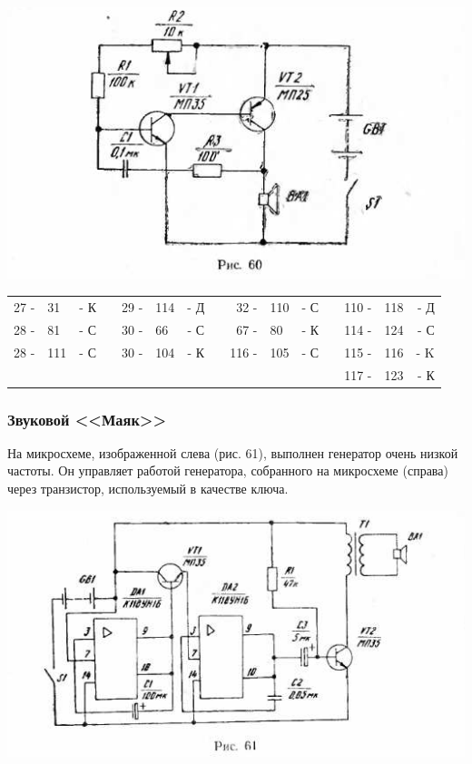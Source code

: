 \documentclass[12pt]{article}
\begin{document}
\includegraphics[scale=0.9, angle=0]{ekon3_060_1}

\hrulefill

\begin{tabular}{r l r p{0.5cm} r l r p{0.5cm} r l r p{0.5cm} r l r}
27 - &  31 & - К &   & 29 - & 114 & - Д &   &  32 - & 110 & - С &   & 110 - & 118  & - Д\\
28 - &  81 & - С &   & 30 - &  66 & - С &   &  67 - &  80 & - К &   & 114 - & 124  & - С\\
28 - & 111 & - С &   & 30 - & 104 & - К &   & 116 - & 105 & - С &   & 115 - & 116  & - K\\
     &     &     &   &      &     &     &   &       &     &     &   & 117 - & 123  & - К\\
\end{tabular}

\hrulefill

\subsubsection{ Звуковой <<Маяк>>}

На микросхеме, изображенной слева (рис. 61), выполнен генератор очень низкой частоты. Он управляет работой генератора, собранного на микросхеме (справа) через транзистор, используемый в качестве ключа.

\newpage

\includegraphics[scale=1, angle=0]{ekon3_061_1}
\end{document}
